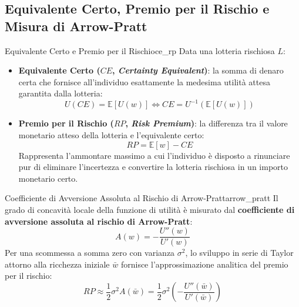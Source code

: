 \subsection{Equivalente Certo, Premio per il Rischio e Misura di Arrow-Pratt}
\begin{definizione}{Equivalente Certo e Premio per il Rischio}{ce_rp}
Data una lotteria rischiosa $L$:
\begin{itemize}
    \item \textbf{Equivalente Certo ($CE$, \textit{Certainty Equivalent})}: la somma di denaro certa che fornisce all'individuo esattamente la medesima utilità attesa garantita dalla lotteria:
    \begin{equation}
        U(CE) = \mathbb{E}[U(w)] \iff CE = U^{-1}(\mathbb{E}[U(w)])
    \end{equation}
    \item \textbf{Premio per il Rischio ($RP$, \textit{Risk Premium})}: la differenza tra il valore monetario atteso della lotteria e l'equivalente certo:
    \begin{equation}
        RP = \mathbb{E}[w] - CE
    \end{equation}
    Rappresenta l'ammontare massimo a cui l'individuo è disposto a rinunciare pur di eliminare l'incertezza e convertire la lotteria rischiosa in un importo monetario certo.
\end{itemize}
\end{definizione}

\begin{teorema}{Coefficiente di Avversione Assoluta al Rischio di Arrow-Pratt}{arrow_pratt}
Il grado di concavità locale della funzione di utilità è misurato dal \textbf{coefficiente di avversione assoluta al rischio di Arrow-Pratt}:
\begin{equation}
    A(w) = -\frac{U''(w)}{U'(w)}
\end{equation}
Per una scommessa a somma zero con varianza $\sigma^2$, lo sviluppo in serie di Taylor attorno alla ricchezza iniziale $\bar{w}$ fornisce l'approssimazione analitica del premio per il rischio:
\begin{equation}
    RP \approx \frac{1}{2} \sigma^2 A(\bar{w}) = \frac{1}{2} \sigma^2 \left( -\frac{U''(\bar{w})}{U'(\bar{w})} \right)
\end{equation}
\end{teorema}

